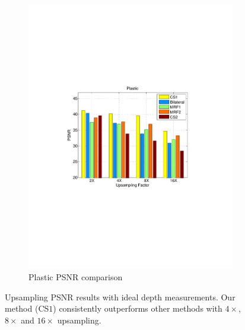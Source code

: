 \documentclass[preprint,10pt,5p,times,twocolumn]{elsarticle}
\begin{document}
\begin{figure}
\begin{subfigure}[b]{0.24\textwidth}
\includegraphics[width=\textwidth]{fig_exp1_plastic.pdf}
\caption*{Plastic PSNR comparison}
\end{subfigure}
\caption{Upsampling PSNR results with ideal depth measurements. Our method (CS$1$) consistently outperforms other methods with $4\times$, $8\times$ and $16\times$ upsampling.}
\label{fig:exp1}
\end{figure}
\end{document}

